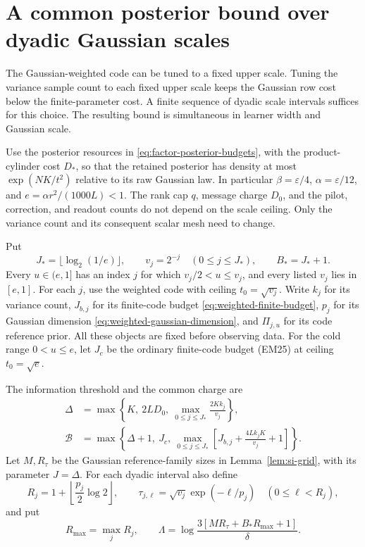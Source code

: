 \section{A common posterior bound over dyadic Gaussian scales}
\label{app:weighted-code}

The Gaussian-weighted code can be tuned to a fixed upper scale.
Tuning the variance sample count to each fixed upper scale keeps the
Gaussian row cost below the finite-parameter cost. A finite sequence
of dyadic scale intervals suffices for this choice. The resulting bound is simultaneous in learner
width and Gaussian scale.

Use the posterior resources in
\eqref{eq:factor-posterior-budgets}, with the product-cylinder cost
$D_*$, so that the retained posterior has density at most
$\exp(NK/t^2)$ relative to its raw Gaussian law. In particular
$\beta=\varepsilon/4$, $\alpha=\varepsilon/12$, and
$e=\alpha r^2/(1000L)<1$.
The rank cap $q$, message charge $D_0$, and the pilot, correction, and
readout counts do not depend on the scale ceiling. Only the variance
count and its consequent scalar mesh need to change.

Put
\begin{equation}\label{eq:weighted-dyadic-scales}
 J_*=\lfloor\log_2(1/e)\rfloor,\qquad
 v_j=2^{-j}\quad(0\le j\le J_*),\qquad B_*=J_*+1.
\end{equation}
Every $u\in(e,1]$ has an index $j$ for which
$v_j/2<u\le v_j$, and every listed $v_j$ lies in $[e,1]$.
For each $j$, use the weighted code with ceiling $t_0=\sqrt{v_j}$.
Write $k_j$ for its variance count, $J_{b,j}$ for its finite-code budget
\eqref{eq:weighted-finite-budget}, $p_j$ for its Gaussian dimension
\eqref{eq:weighted-gaussian-dimension}, and $\Pi_{j,u}$ for its
code reference prior. All these objects are fixed before observing data.
For the cold range $0<u\le e$, let $J_c$ be the ordinary finite-code
budget (EM25) at ceiling $t_0=\sqrt e$.

The information threshold and the common charge are
\begin{equation}\label{eq:weighted-dyadic-budget}
 \begin{split}
 \Delta&=\max\left\{K,\ 2LD_0,\
                  \max_{0\le j\le J_*}\frac{2Kk_j}{v_j}\right\},\\
 \mathcal B&=\max\left\{\Delta+1,\ J_c,\
       \max_{0\le j\le J_*}
       \left[J_{b,j}+\frac{4Lk_jK}{v_j}+1\right]\right\}.
 \end{split}
\end{equation}
Let $M,R_\tau$ be the Gaussian reference-family sizes in
Lemma~\ref{lem:si-grid}, with its parameter $J=\Delta$.
For each dyadic interval also define
\begin{equation}\label{eq:weighted-dyadic-grid}
 R_j=1+\left\lfloor\frac{p_j}{2}\log2\right\rfloor,\qquad
 \tau_{j,\ell}=\sqrt{v_j}\exp(-\ell/p_j)
          \quad(0\le\ell<R_j),
\end{equation}
and put
\[
 R_{\max}=\max_j R_j,\qquad
 \Lambda=\log\frac{3[MR_\tau+B_*R_{\max}+1]}{\delta}.
\]

